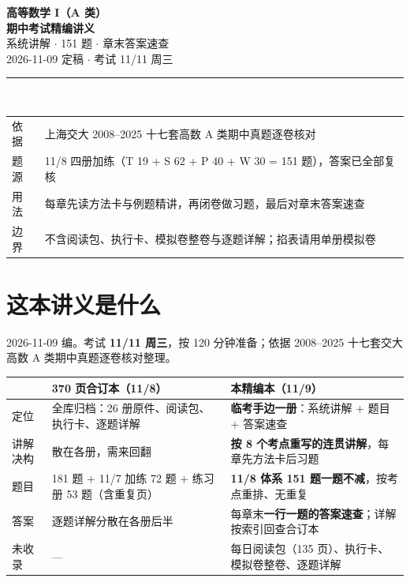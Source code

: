 \documentclass[11pt,a4paper]{ctexart}
\begin{document}
\begin{center}
\vspace*{1.0cm}
{\Huge\bfseries 高等数学 I（A 类）}\\[5pt]
{\Huge\bfseries 期中考试精编讲义}\\[12pt]
{\Large 系统讲解 $\cdot$ 151 题 $\cdot$ 章末答案速查}\\[8pt]
{\large 2026-11-09 定稿 $\cdot$ 考试 11/11 周三}\\[16pt]
\rule{0.8\linewidth}{0.6pt}\\[12pt]
\begin{tabular}{@{}ll@{}}
依据 & 上海交大 2008--2025 十七套高数 A 类期中真题逐卷核对 \\
题源 & 11/8 四册加练（T 19 + S 62 + P 40 + W 30 = 151 题），答案已全部复核 \\
用法 & 每章先读方法卡与例题精讲，再闭卷做习题，最后对章末答案速查 \\
边界 & 不含阅读包、执行卡、模拟卷整卷与逐题详解；掐表请用单册模拟卷 \\
\end{tabular}
\end{center}
\newpage
\section*{这本讲义是什么}
\vspace{-2mm}
{\small 2026-11-09 编。考试 \textbf{11/11 周三}，按 120 分钟准备；依据 2008--2025 十七套交大高数 A 类期中真题逐卷核对整理。}

\begin{center}
\begin{tabular}{@{}p{3.0cm}p{5.6cm}p{6.6cm}@{}}
\toprule
 & \textbf{370 页合订本（11/8）} & \textbf{本精编本（11/9）} \\
\midrule
定位 & 全库归档：26 册原件、阅读包、执行卡、逐题详解 & \textbf{临考手边一册}：系统讲解 + 题目 + 答案速查 \\
讲解决构 & 散在各册，需来回翻 & \textbf{按 8 个考点重写的连贯讲解}，每章先方法卡后习题 \\
题目 & 181 题 + 11/7 加练 72 题 + 练习册 53 题（含重复页） & \textbf{11/8 体系 151 题一题不减}，按考点重排、无重复 \\
答案 & 逐题详解分散在各册后半 & 每章末\textbf{一行一题的答案速查}；详解按索引回查合订本 \\
未收录 & — & 每日阅读包（135 页）、执行卡、模拟卷整卷、逐题详解 \\
\bottomrule
\end{tabular}
\end{center}
\end{document}
